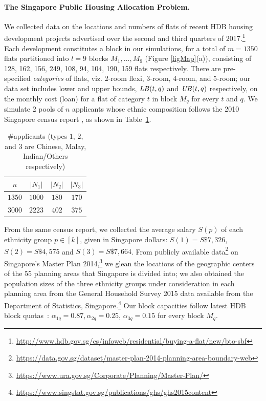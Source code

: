 \documentclass[11pt,dvipdfmx]{article}
\begin{document}
\paragraph{The Singapore Public Housing Allocation Problem.} 
We collected data on the locations and numbers of flats of recent HDB housing development projects advertised over the second and third quarters of 2017.\footnote{\url{http://www.hdb.gov.sg/cs/infoweb/residential/buying-a-flat/new/bto-sbf}} 
Each development constitutes a block in our simulations, for a total of $m = 1350$ flats partitioned into $l = 9$ blocks $M_1, \ldots, M_9$ (Figure \ref{figMap}(a)), consisting of 128, 162, 156, 249, 108, 94, 104, 190, 159 flats respectively. There are pre-specified \emph{categories} of flats, viz. 2-room flexi, 3-room, 4-room, and 5-room; our data set includes lower and upper bounds, $\operatorname{\mathit{LB}}(t,q)$ and $\operatorname{\mathit{UB}}(t,q)$ respectively, on the monthly cost (loan) for a flat of category $t$ in block $M_q$ for every $t$ and $q$.
We simulate $2$ pools of $n$ applicants whose ethnic composition follows the 2010 Singapore census report \cite{Sing2010}, as shown in Table~\ref{SGtable}.
\begin{table}
	\begin{tabular}{|c|c|c|c|}
		\hline
		$n$ & $|N_1|$& $|N_2|$ & $|N_3|$ \\ \hline
		$1350$ & $1000$ & $180$ & $170$\\
		$3000$ & $2223$ & $402$ & $375$\\ \hline
	\end{tabular}
\caption{$\#$applicants (types $1$, $2$, and $3$ are Chinese, Malay, Indian/Others respectively)\label{SGtable}}
\end{table}
From the same census report, we collected the average salary $S(p)$ of each ethnicity group $p \in [k]$, given in Singapore dollars: $S(1) = S\$7,326$, $S(2)=S\$4,575$ and $S(3) = S\$7,664$. 
From publicly available data\footnote{\url{https://data.gov.sg/dataset/master-plan-2014-planning-area-boundary-web}} on Singapore's Master Plan 2014,\footnote{\url{https://www.ura.gov.sg/Corporate/Planning/Master-Plan/}} we glean the locations of the geographic centers of the $55$ planning areas that Singapore is divided into; we also obtained the population sizes of the three ethnicity groups under consideration in each planning area from the General Household Survey 2015 data available from the Department of Statistics, Singapore.\footnote{\url{https://www.singstat.gov.sg/publications/ghs/ghs2015content}}
Our block capacities follow latest HDB block quotas~\cite{deng2013publichousing}: $\alpha_{1q} = 0.87, \alpha_{2q} = 0.25$, $\alpha_{3q} = 0.15$ for every block $M_q$. 
\end{document}
